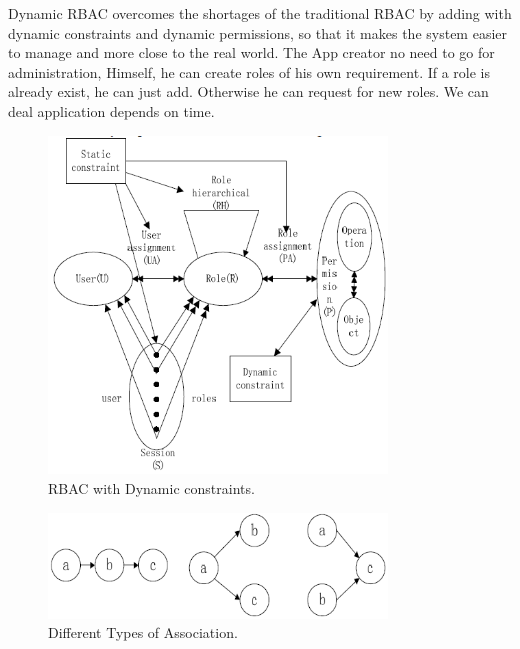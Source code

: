 \documentclass[12pt]{report}
\begin{document}
		Dynamic RBAC overcomes the shortages of the traditional RBAC by adding with dynamic constraints and dynamic permissions, so that it makes the system easier to manage and more close to the real world. The App creator no need to go for administration, Himself, he can create roles of his own requirement. If a role is already exist, he can just add. Otherwise he can request for new roles. We can deal application depends on time.
		\begin{figure}[H]
		\begin{center}
		\includegraphics[width=9cm]{./4-5.png}
		\caption{ RBAC with Dynamic constraints. \label{fig:RBAC with Dynamic constraints. }}
		\end{center}
		\end{figure}
		\begin{figure}[H]
		\begin{center}
		\includegraphics[width=9cm]{./4-6.png}
		\caption{ Different Types of Association. \label{fig:Different Types of Association. }}
		\end{center}
		\end{figure}
\end{document}
